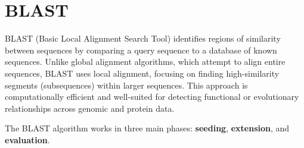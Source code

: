 \section{BLAST}

BLAST (Basic Local Alignment Search Tool)
identifies regions of similarity between sequences by comparing a query sequence to a database of known sequences. Unlike global alignment algorithms, which attempt to align entire sequences, BLAST uses local alignment, focusing on finding high-similarity segments (subsequences) within larger sequences. This approach is computationally efficient and well-suited for detecting functional or evolutionary relationships across genomic and protein data.

The BLAST algorithm works in three main phases: \textbf{seeding}, \textbf{extension}, and \textbf{evaluation}.


